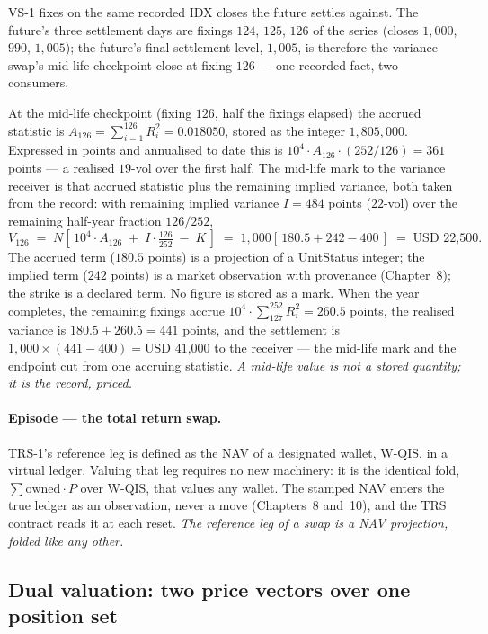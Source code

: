 \documentclass[11pt,a4paper]{article}
\newcommand{\USD}[1]{\mbox{USD~#1}}
\begin{document}
VS-1 fixes on the same recorded IDX closes the future settles against. The
future's three settlement days are fixings $124$, $125$, $126$ of the series
(closes $1{,}000$, $990$, $1{,}005$); the future's final settlement level,
$1{,}005$, is therefore the variance swap's mid-life checkpoint close at fixing
$126$ --- one recorded fact, two consumers.

At the mid-life checkpoint (fixing $126$, half the fixings elapsed) the accrued
statistic is $A_{126} = \sum_{i=1}^{126} R_i^2 = 0.018050$, stored as the
integer $1{,}805{,}000$. Expressed in points and annualised to date this is
$10^4 \cdot A_{126}\cdot(252/126) = 361$ points --- a realised $19$-vol over the
first half. The mid-life mark to the variance receiver is that accrued
statistic plus the remaining implied variance, both taken from the record: with
remaining implied variance $I = 484$ points ($22$-vol) over the remaining
half-year fraction $126/252$,
\[
  V_{126} \;=\; N\left[\,10^4\!\cdot A_{126} \;+\; I\cdot\tfrac{126}{252} \;-\; K\,\right]
         \;=\; 1{,}000\left[\,180.5 + 242 - 400\,\right] \;=\; \USD{22,500}.
\]
The accrued term ($180.5$ points) is a projection of a UnitStatus integer; the
implied term ($242$ points) is a market observation with provenance
(Chapter~8); the strike is a declared term. No figure is stored as a mark. When
the year completes, the remaining fixings accrue $10^4\!\cdot\!\sum_{127}^{252}
R_i^2 = 260.5$ points, the realised variance is $180.5 + 260.5 = 441$ points,
and the settlement is $1{,}000\times(441 - 400) = \USD{41,000}$ to the receiver
--- the mid-life mark and the endpoint cut from one accruing statistic.
\emph{A mid-life value is not a stored quantity; it is the record, priced.}

\paragraph{Episode --- the total return swap.}
TRS-1's reference leg is defined as the NAV of a designated wallet, W-QIS, in a
virtual ledger. Valuing that leg requires no new machinery: it is the identical
fold, $\sum \mathrm{owned}\cdot P$ over W-QIS, that values any wallet. The
stamped NAV enters the true ledger as an observation, never a move
(Chapters~8 and~10), and the TRS contract reads it at each reset.
\emph{The reference leg of a swap is a NAV projection, folded like any other.}

\subsection{Dual valuation: two price vectors over one position set}
\end{document}
